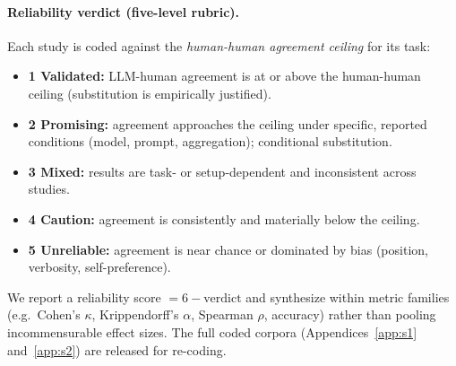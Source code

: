 \paragraph{Reliability verdict (five-level rubric).} Each study is coded against the \emph{human-human agreement
ceiling} for its task:
\begin{itemize}[leftmargin=1.4em,itemsep=1pt]
\item \textbf{1 Validated:} LLM-human agreement is at or above the human-human ceiling (substitution is empirically
justified).
\item \textbf{2 Promising:} agreement approaches the ceiling under specific, reported conditions (model, prompt,
aggregation); conditional substitution.
\item \textbf{3 Mixed:} results are task- or setup-dependent and inconsistent across studies.
\item \textbf{4 Caution:} agreement is consistently and materially below the ceiling.
\item \textbf{5 Unreliable:} agreement is near chance or dominated by bias (position, verbosity, self-preference).
\end{itemize}
We report a reliability score $=6-\text{verdict}$ and synthesize within metric families (e.g.\ Cohen's $\kappa$,
Krippendorff's $\alpha$, Spearman $\rho$, accuracy) rather than pooling incommensurable effect sizes. The full coded
corpora (Appendices~\ref{app:s1} and~\ref{app:s2}) are released for re-coding.

